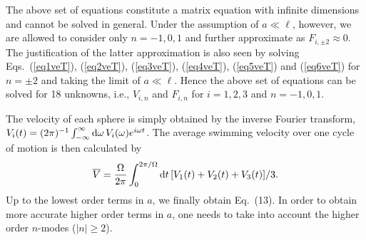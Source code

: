 \documentclass[nofootinbib,twocolumn,showpacs,preprintnumbers,pre,aps]{revtex4-1}
\begin{document}
The above set of equations constitute a matrix equation with infinite dimensions 
and cannot be solved in general.  
Under the assumption of $a\ll\ell$, however, we are allowed to consider only
$n=-1, 0, 1$ and further approximate as $F_{i,\pm2}\approx 0$. 
The justification of the latter approximation is also seen by solving 
Eqs.~(\ref{eq1veT}), (\ref{eq2veT}), (\ref{eq3veT}), (\ref{eq4veT}), 
(\ref{eq5veT}) and (\ref{eq6veT}) for $n=\pm2$ and taking the limit of $a\ll\ell$.
Hence the above set of equations can be solved for 18 unknowns, i.e., 
$V_{i,n}$ and $F_{i,n}$ for $i=1, 2, 3$ and $n=-1, 0, 1$.


The velocity of each sphere is simply obtained by the inverse Fourier transform,
$V_i(t)=(2\pi)^{-1} \int_{-\infty}^{\infty} {\rm d} \omega\, V_i(\omega) e^{i\omega t}$.
The average swimming velocity over one cycle of motion is then calculated by 
\begin{equation}
\label{barV}
\overline{V}=\frac{\Omega}{2\pi}\int_0^{2\pi/\Omega}{\rm d}t\, 
[V_1(t)+V_2(t)+V_3(t)]/3.
\end{equation}
Up to the lowest order terms in $a$, we finally obtain Eq.~(13).
In order to obtain more accurate higher order terms in $a$, one needs to 
take into account the higher order $n$-modes ($|n| \ge 2$).
\end{document}

